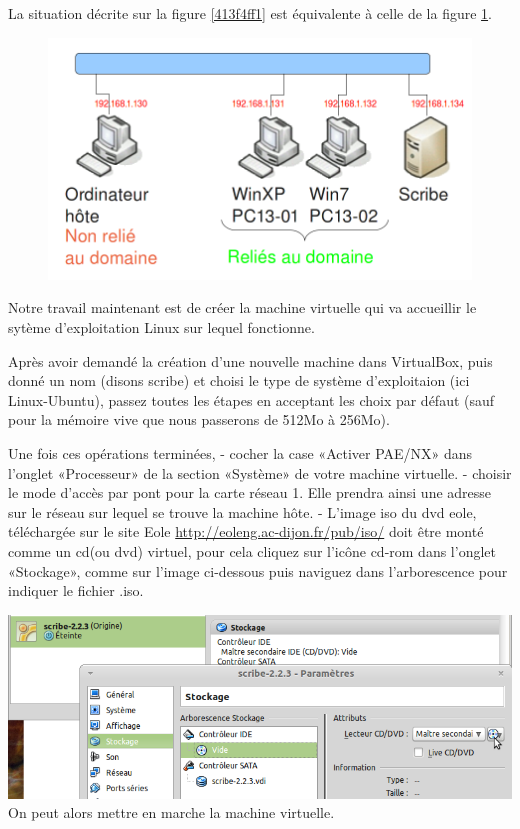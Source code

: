 \documentclass{article}
\makeatletter
\def\maxwidth{\ifdim\Gin@nat@width>\linewidth\linewidth
\else\Gin@nat@width\fi}
\let\Oldincludegraphics\includegraphics
\renewcommand{\includegraphics}[1]{\Oldincludegraphics[width=\maxwidth]{#1}}
\makeatother
\begin{document}
La situation décrite sur la figure \ref{413f4ff1} est équivalente à
celle de la figure \ref{78733841}.

\begin{figure}[htbp]
\centering
\includegraphics{scribe_html_78733841.png}
\caption{\label{78733841}}
\end{figure}

Notre travail maintenant est de créer la machine virtuelle qui va
accueillir le sytème d'exploitation Linux sur lequel fonctionne.

Après avoir demandé la création d'une nouvelle machine dans VirtualBox,
puis donné un nom (disons scribe) et choisi le type de système
d'exploitaion (ici Linux-Ubuntu), passez toutes les étapes en acceptant
les choix par défaut (sauf pour la mémoire vive que nous passerons de
512Mo à 256Mo).

Une fois ces opérations terminées, - cocher la case «Activer PAE/NX»
dans l'onglet «Processeur» de la section «Système» de votre machine
virtuelle. - choisir le mode d'accès par pont pour la carte réseau 1.
Elle prendra ainsi une adresse sur le réseau sur lequel se trouve la
machine hôte. - L'image iso du dvd eole, téléchargée sur le site Eole
\url{http://eoleng.ac-dijon.fr/pub/iso/} doit être monté comme un cd(ou
dvd) virtuel, pour cela cliquez sur l'icône cd-rom dans l'onglet
«Stockage», comme sur l'image ci-dessous puis naviguez dans
l'arborescence pour indiquer le fichier .iso.

\includegraphics{scribe_html_m69a9bc5b.png}\\ On peut alors mettre en
marche la machine virtuelle.
\end{document}
